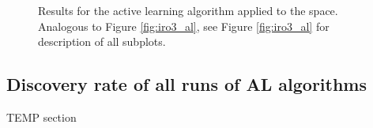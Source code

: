 \begin{figure}[!htb]
\centering
{}
\caption{\label{fig:iro2_al}
%
Results for the active learning algorithm applied to the \IrOtwo space.
%
Analogous to Figure \ref{fig:iro3_al}, see Figure \ref{fig:iro3_al} for description of all subplots.
}
\end{figure}


\subsection{Discovery rate of all runs of AL algorithms} %


%
%
TEMP section




